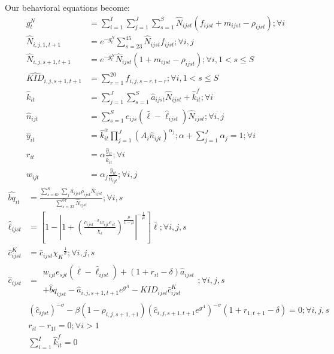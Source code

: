 \documentclass[letterpaper,12pt]{article}
\theoremstyle{definition}
\numberwithin{equation}{section}
\begin{document}
\begin{spacing}{1.5}
	Our behavioral equations become:
	\begin{align}
		g^N_t & = \sum_{i=1}^I \sum_{j=1}^J \sum_{s=1}^S \hat N_{ijst} (f_{ijst}+m_{ijst}-\rho_{ijst}) ; \forall i \label{eq_5demo1}\\
		\hat N_{i,j,1,t+1} & = e^{-g^N_t}\sum_{s=23}^{45} \hat N_{ijst} f_{ijst} ; \forall i,j \\
		\hat N_{i,j,s+1,t+1} & = e^{-g^N_t}\hat N_{ijst} (1+m_{ijst}-\rho_{ijst}); \forall i, 1<s\le S \\
		\hat{KID}_{i,j,s+1,t+1} & = \sum_{r=1}^{20} f_{i,j,s-r,t-r}; \forall i, 1<s\le S \label{eq_5demo4}\\
		\hat k_{it} & = \sum_{j=1}^J \sum_{s=1}^S \hat a_{ijst} \hat N_{ijst} + \hat k_{it}^f; \forall i \label{eq_5ksum}\\
		\hat n_{ijt} & = \sum_{s=1}^S e_{ijs} (\bar \ell - \hat \ell_{ijst} ) \hat N_{ijst}; \forall i,j \label{eq_5nsum}\\
		\hat y_{it} & = \hat k_{it}^\alpha \prod_{j=1}^J \left( A_{i} \hat n_{ijt} \right)^{\alpha_j}; \alpha + \sum_{j=1}^J \alpha_j = 1 ; \forall i \label{eq_5yfunc} \\
		r_{it} & = \alpha \frac{\hat y_{it}}{\hat k_{it}}; \forall i \label{eq_5rfunc}\\
		w_{ijt} & = \alpha_j \frac{\hat y_{it}}{\hat n_{ijt}}; \forall i,j \label{eq_5wfunc}
	\end{align}
	\begin{align}
		\hat {bq}_{it} & = \frac{\sum_{s=67}^S \sum_j \hat a_{ijst} \rho_{ijst} \hat N_{ijst}}{\sum_{s=23}^{67} \hat N_{ijst}} ; \forall i,s \label{eq_5bqfunc}\\
    	\hat \ell_{ijst} & = \left[ 1 - \left| 1 + \left( \frac{{c_{ijst}}^{-\sigma} w_{ijt} e_{st}}{\chi_\ell} \right)^{\frac{\mu}{1-\mu}} \right|^{-\frac{1}{\mu}} \right] \bar \ell; \forall i,j,s \label{eq_5elldef} \\
		\hat c^K_{ijst} & = \hat c_{ijst} {\chi_K}^{\frac{1}{\sigma}}; \forall i,j,s \label{eq_5cKdef} \\
		\hat c_{ijst} & = \begin{matrix} w_{ijt} e_{sjt} (\bar \ell - \hat \ell_{ijst}) + (1+r_{it}-\delta)\hat a_{ijst} \\ +\hat bq_{ijst} - \hat a_{i,j,s+1,t+1} e^{g^A} - {KID}_{ijst} \hat c^K_{ijst}\end{matrix}; \forall i,j,s \label{eq_5BC} \\
		& \left({\hat c_{ijst}}\right)^{-\sigma} - \beta (1-\rho_{i,j,s+1,+1}) \left(\hat c_{i,j,s+1,t+1} e^{g^A}\right)^{-\sigma}(1+r_{1,t+1}-\delta) = 0; \forall i,j,s \label{eq_5HH5func}\\
		& r_{it} - r_{1t} = 0; \forall i>1 \label{eq_5requal}\\
		& \sum_{i=1}^I \hat k^f_{it} = 0 \label{eq_5kfsum}
	\end{align}



\end{spacing}
\end{document}
